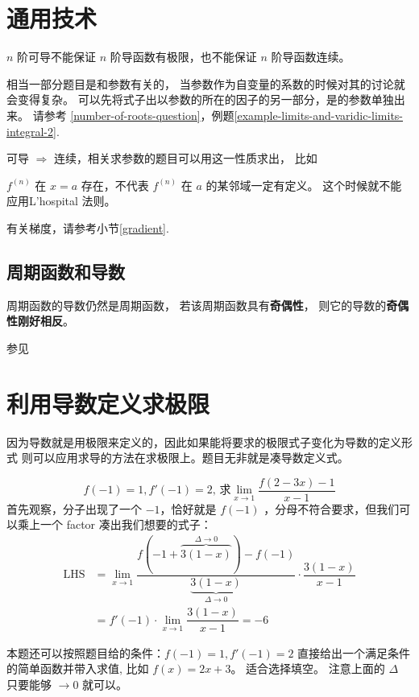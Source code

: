 \section{通用技术}
\label{general-technics-single-var-differentiation}

$n$ 阶可导不能保证 $n$ 阶导函数有极限，也不能保证 $n$ 阶导函数连续。

相当一部分题目是和参数有关的，
当参数作为自变量的系数的时候对其的讨论就会变得复杂。
可以先将式子出以参数的所在的因子的另一部分，是的参数单独出来。
请参考 \ref{number-of-roots-question}，例题\ref{example-limits-and-varidic-limits-integral-2}.

可导 $\Rightarrow$ 连续，相关求参数的题目可以用这一性质求出，
比如 \cite[quest27]{w660}

$f^{(n)}$ 在 $x = a$ 存在，不代表 $f^{(n)}$ 在 $a$ 的某邻域一定有定义。
这个时候就不能应用L'hospital 法则。

有关梯度，请参考小节\ref{gradient}.

\subsection{周期函数和导数}

周期函数的导数仍然是周期函数，
若该周期函数具有\textbf{奇偶性}，
则它的导数的\textbf{奇偶性刚好相反}。

参见 \cite[quest29]{w660}

\section{利用导数定义求极限}

因为导数就是用极限来定义的，因此如果能将要求的极限式子变化为导数的定义形式
则可以应用求导的方法在求极限上。题目无非就是凑导数定义式。

\begin{example}
    \[
        f(-1) = 1, f'(-1) = 2, \, \mbox{求} \lim_{x \to 1 } \dfrac{f(2-3x) - 1}{x-1}
    \]
    首先观察，分子出现了一个 $-1$，恰好就是 $f(-1)$ ，分母不符合要求，但我们可以乘上一个 factor
    凑出我们想要的式子：
    \begin{align*}
        \mbox{LHS} &= \lim_{x \to 1 } \dfrac{f(-1+\overbrace{3(1-x)}^{\Delta \to 0}) -
             f(-1)}{\underbrace{3(1-x)}_{\Delta \to 0}} \cdot \dfrac{3(1-x)}{x-1} \\
             &= f'(-1) \cdot \lim_{x \to 1} \dfrac{3(1-x)}{x-1} = -6
    \end{align*}
\end{example}
本题还可以按照题目给的条件：$f(-1) = 1, f'(-1) = 2$ 直接给出一个满足条件的简单函数并带入求值,
比如 $f(x) = 2x+3$。
适合选择填空。
注意上面的 $\Delta$ 只要能够 $\to 0$ 就可以。


